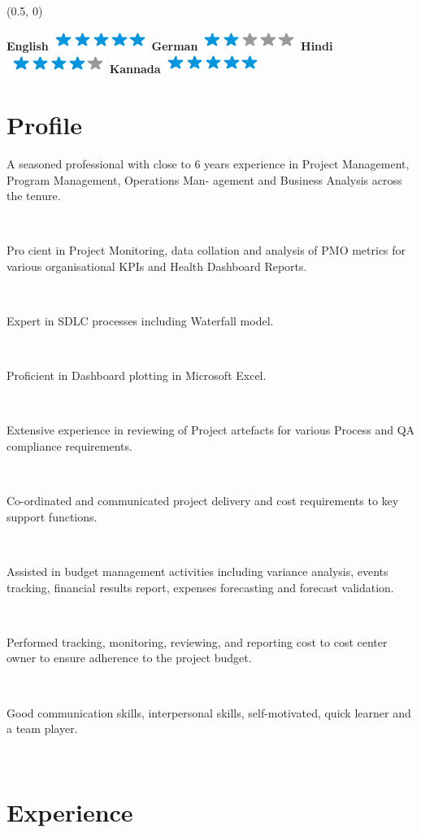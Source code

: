 \documentclass[11pt,a4paper,sans]{moderncv}
\newenvironment{aside}{%
  \let\oldsection\section
  \renewcommand{\section}[1]{
    \par\vspace{\baselineskip}{\Large\headingfont\color{pblue} ##1}
  }
  \begin{textblock}{4}(0.5, 0)
  \begin{flushleft}
  \obeycr
}{%
  \restorecr
  \end{flushleft}
  \end{textblock}
  \let\section\oldsection
}
\newcommand\mybitem[1]{%
   \parbox[t]{2mm}{\textbullet}\parbox[t]{12.5cm}{#1}\\[1.6mm]}
\begin{document}
\begin{aside}
  \section{Languages}
  \vspace{0.7cm}
    \textbf{English}\includegraphics[scale=0.40]{img/5stars.png}
    \textbf{German}\includegraphics[scale=0.40]{img/2stars.png}
    \textbf{Hindi}\includegraphics[scale=0.40]{img/4stars.png}
    \textbf{Kannada}\includegraphics[scale=0.40]{img/5stars.png}
~
\end{aside}



\section{Profile}
\mybitem{A seasoned professional with close to 6 years experience in Project Management, Program Management, Operations Man- agement and Business Analysis across the tenure.}
\mybitem{Pro cient in Project Monitoring, data collation and analysis of PMO metrics for various organisational KPIs and Health Dashboard Reports.}
\mybitem{Expert in SDLC processes including Waterfall model.}
\mybitem{Proficient in Dashboard plotting in Microsoft Excel.}
\mybitem{Extensive experience in reviewing of Project artefacts for various Process and QA compliance requirements.}
\mybitem{Co-ordinated and communicated project delivery and cost requirements to key support functions.}
\mybitem{Assisted in budget management activities including variance analysis, events tracking, financial results report, expenses forecasting and forecast validation.}
\mybitem{Performed tracking, monitoring, reviewing, and reporting cost to cost center owner to ensure adherence to the project budget.}
\mybitem{Good communication skills, interpersonal skills, self-motivated, quick learner and a team player.}


\section{Experience}
\vspace{0.5cm}
\end{document}
